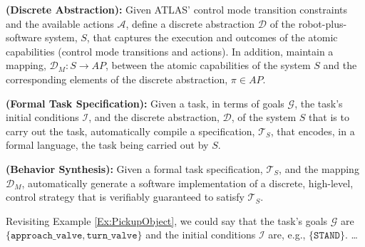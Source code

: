 
\begin{myProblem}\label{DiscreteAbstractionProblem}
\textbf{(Discrete Abstraction):}
Given ATLAS' control mode transition constraints and the available actions $\mathcal{A}$, define a discrete abstraction $\mathcal{D}$ of the robot-plus-software system, $S$, that captures the execution and outcomes of the atomic capabilities (control mode transitions and actions).
In addition, maintain a mapping, $\mathcal{D}_M : S \rightarrow AP$, between the atomic capabilities of the system $S$ and the corresponding elements of the discrete abstraction, $\pi \in AP$.
\end{myProblem}

\begin{myProblem}\label{SpecificationProblem}
\textbf{(Formal Task Specification):}
Given a task, in terms of goals $\mathcal{G}$, the task's initial conditions $\mathcal{I}$, and the discrete abstraction, $\mathcal{D}$, of the system $S$ that is to carry out the task, automatically compile a specification, $\mathcal{T}_S$, that encodes, in a formal language, the task being carried out by $S$.
\end{myProblem}

\begin{myProblem}\label{BehaviorSynthesisProblem}
\textbf{(Behavior Synthesis):}
Given a formal task specification, $\mathcal{T}_S$, and the mapping $\mathcal{D}_M$, automatically generate a software implementation of a discrete, high-level, control strategy that is verifiably guaranteed to satisfy $\mathcal{T}_S$.
\end{myProblem}

Revisiting Example \ref{Ex:PickupObject}, we could say that the task's goals $\mathcal{G}$ are $\{ \mathtt{approach\_valve}, \mathtt{turn\_valve} \}$ and the initial conditions $\mathcal{I}$ are, e.g., $\{ \mathtt{STAND} \}$.
\ldots

